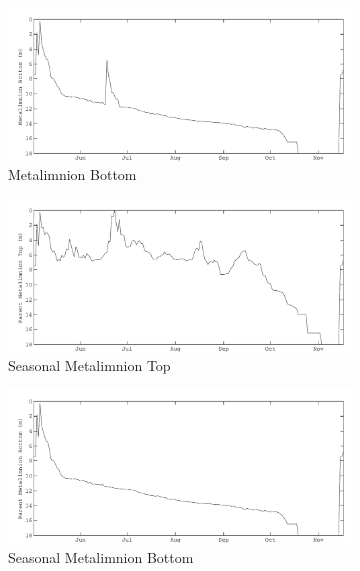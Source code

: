 \begin{figure}
    \begin{subfigure}{\lafigsize}
      \caption{\label{fig:la:out:metaB}Metalimnion Bottom}
      \includegraphics[width=\linewidth]{figures/Sparkling_metaB.pdf}
    \end{subfigure}
    \begin{subfigure}{\lafigsize}
      \caption{\label{fig:la:out:SmetaT}Seasonal Metalimnion Top}
      \includegraphics[width=\linewidth]{figures/Sparkling_SmetaT.pdf}
    \end{subfigure}
    \begin{subfigure}{\lafigsize}
      \caption{\label{fig:la:out:SmetaB}Seasonal Metalimnion Bottom}
      \includegraphics[width=\linewidth]{figures/Sparkling_SmetaB.pdf}
    \end{subfigure}
    \begin{subfigure}{\lafigsize}

\end{subfigure}
\end{figure}
